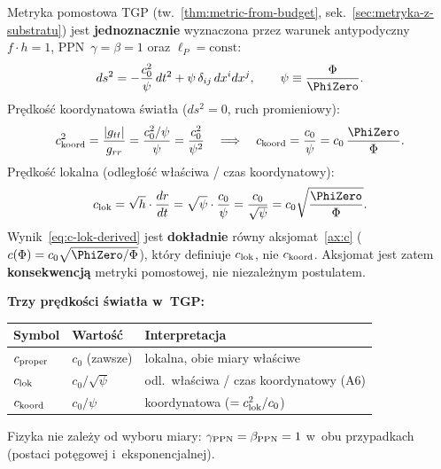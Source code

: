 \begin{proposition}\label{prop:c-from-metric}
Metryka pomostowa TGP (tw.~\ref{thm:metric-from-budget},
sek.~\ref{sec:metryka-z-substratu}) jest \textbf{jednoznacznie}
wyznaczona przez warunek antypodyczny $f \cdot h = 1$,
PPN~$\gamma = \beta = 1$ oraz $\ell_P = \text{const}$:
\begin{equation}\label{eq:metric-bridge-c}
  ds^2 = -\frac{c_0^2}{\psi}\,dt^2
         + \psi\,\delta_{ij}\,dx^i dx^j,
  \qquad \psi \equiv \frac{\Phi}{\PhiZero}.
\end{equation}
Pr\k{e}dko\'s\'c koordynatowa \'swiat\l{}a ($ds^2 = 0$, ruch promieniowy):
\begin{equation}\label{eq:c-from-metric-deriv}
  c_{\rm koord}^2 = \frac{|g_{tt}|}{g_{rr}}
  = \frac{c_0^2/\psi}{\psi}
  = \frac{c_0^2}{\psi^2}
  \quad\Longrightarrow\quad
  c_{\rm koord} = \frac{c_0}{\psi}
  = c_0\,\frac{\PhiZero}{\Phi}.
\end{equation}
Pr\k{e}dko\'s\'c lokalna (odleg\l{}o\'s\'c w\l{}a\'sciwa / czas koordynatowy):
\begin{equation}\label{eq:c-lok-derived}
  c_{\rm lok} = \sqrt{h}\cdot\frac{dr}{dt}
  = \sqrt{\psi}\cdot\frac{c_0}{\psi}
  = \frac{c_0}{\sqrt{\psi}}
  = c_0\sqrt{\frac{\PhiZero}{\Phi}}.
\end{equation}
Wynik~\eqref{eq:c-lok-derived} jest \textbf{dok\l{}adnie} r\'owny
aksjomat~\ref{ax:c} ($c(\Phi) = c_0\sqrt{\PhiZero/\Phi}$),
kt\'ory definiuje $c_{\rm lok}$, nie $c_{\rm koord}$.
Aksjomat jest zatem \textbf{konsekwencj\k{a}} metryki pomostowej,
nie niezale\.znym postulatem.

\medskip\noindent
\textbf{Trzy pr\k{e}dko\'sci \'swiat\l{}a w~TGP:}
\begin{center}\small
\begin{tabular}{@{}lll@{}}
\toprule
\textbf{Symbol} & \textbf{Warto\'s\'c} & \textbf{Interpretacja} \\
\midrule
$c_{\rm proper}$ & $c_0$ (zawsze)
  & lokalna, obie miary w\l{}a\'sciwe \\
$c_{\rm lok}$ & $c_0/\sqrt{\psi}$
  & odl.~w\l{}a\'sciwa / czas koordynatowy (A6) \\
$c_{\rm koord}$ & $c_0/\psi$
  & koordynatowa ($= c_{\rm lok}^2/c_0$) \\
\bottomrule
\end{tabular}
\end{center}
\noindent
Fizyka nie zale\.zy od wyboru miary: $\gamma_{\rm PPN} = \beta_{\rm PPN} = 1$
w~obu przypadkach (postaci pot\k{e}gowej i~eksponencjalnej).


\end{proposition}
